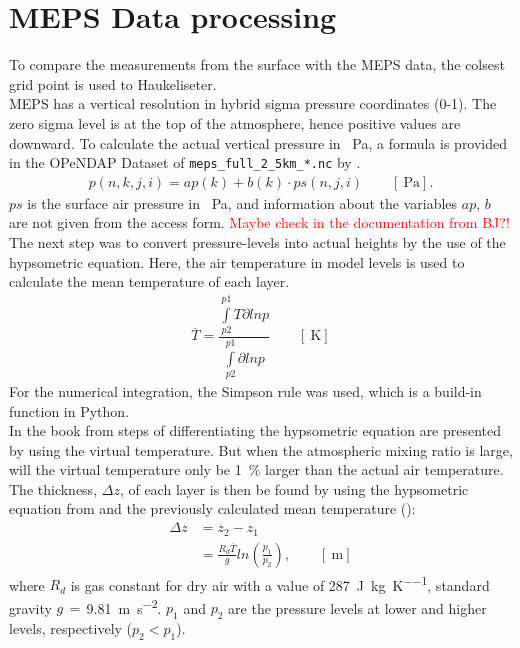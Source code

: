 \section{MEPS Data processing}
\label{sec:MEPS_process}
To compare the measurements from the surface with the MEPS data, the colsest grid point is used to Haukeliseter.
\\
MEPS has a vertical resolution in hybrid sigma pressure coordinates (0-1). The zero sigma level is at the top of the atmosphere, hence positive values are downward. To calculate the actual vertical pressure in \SI{}{\Pa}, a formula is provided in the OPeNDAP Dataset of \texttt{meps\_full\_2\_5km\_*.nc} by \cite{norwegian_meteorological_institute_met_2016}.  
\begin{align}
	p(n,k,j,i) = ap(k) + b(k) \cdot ps(n,j,i) \qquad [\SI{}{\Pa}].
	\label{eq:hybrid_sigma_pressure}
\end{align}
$ps$ is the surface air pressure in \SI{}{\Pa}, and information about the variables $ap$, $b$ are not given from the access form. \textcolor{red}{Maybe check in the documentation from BJ?!}  
\\
The next step was to convert pressure-levels into actual heights by the use of the hypsometric equation. Here, the air temperature in model levels is used to calculate the mean temperature of each layer. 
\begin{align}
	\overline{T} = \dfrac{\int\limits_{p2}^{p1} T \partial ln p}{\int\limits_{p2}^{p1}\partial ln p} \qquad [\SI{}{\kelvin}]
	\label{eq:T_avg}
\end{align}
For the numerical integration, the Simpson rule was used, which is a build-in function in Python. \\
In the book from \cite{martin_mid-latitude_2006} steps of differentiating the hypsometric equation are presented by using the virtual temperature. But when the atmospheric mixing ratio is large, will the virtual temperature only be \SI{1}{\percent} larger than the actual air temperature. 
\\
The thickness, $\Delta z$, of each layer is then be found by using the hypsometric equation from \cite{martin_mid-latitude_2006} and the previously calculated mean temperature ():
\begin{equation}
\begin{split}
\Delta z & = z_2 - z_1 \\
& = \frac{R_d \overline{T}}{g} ln(\frac{p_1}{p_2}), \qquad [\SI{}{\metre}]
\end{split}
\label{eq:hypsometric}
\end{equation}
where $R_d$ is gas constant for dry air with a value of \SI{287}{\joule\per\kilogram\per\kelvin},  standard gravity $g\,=\,$\SI{9.81}{\metre\per\square\second}. $p_1$ and $p_2$ are the pressure levels at lower and higher levels, respectively ($p_2 < p_1$).

